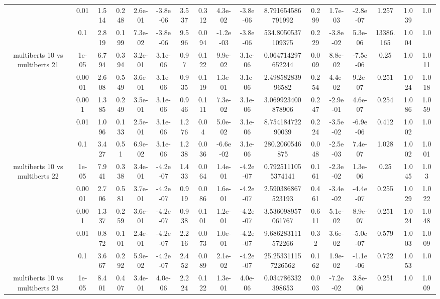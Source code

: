 \begin{tabular}{|c|c|c|c|c|c|c|c|c|c|c|c|c|c|c|c|c|}
 & 0.01 & 1.514 & 0.248 & 2.6e-01 & -3.8e-06 & 3.537 & 0.312 & 4.3e-02 & -3.8e-06 & 8.791654586791992 & 0.299 & 1.7e-03 & -2.8e-07 & 1.257 & 1.039 & 1.0 \\
 & 0.1 & 2.819 & 0.199 & 7.3e-02 & -3.8e-06 & 9.596 & 0.094 & -1.2e-03 & -3.8e-06 & 534.8050537109375 & 0.229 & -3.8e-02 & 5.3e-06 & 13386.165 & 1.004 & 1.0 \\
\hline
\multirow{5}{*}{multiberts 10 vs multiberts 21} & 1e-05 & 6.794 & 0.394 & 3.2e-01 & 3.1e-06 & 0.97 & 0.122 & 9.9e-02 & 3.1e-06 & 0.064714297652244 & 0.009 & 8.8e-02 & -7.5e-06 & 0.25 & 1.0 & 1.011 \\
 & 0.0001 & 2.608 & 0.549 & 3.6e-01 & 3.1e-06 & 0.935 & 0.119 & 1.3e-01 & 3.1e-06 & 2.49858283996582 & 0.254 & 4.4e-02 & 9.2e-07 & 0.251 & 1.024 & 1.018 \\
 & 0.001 & 1.385 & 0.249 & 3.5e-01 & 3.1e-06 & 0.946 & 0.111 & 7.3e-02 & 3.1e-06 & 3.069923400878906 & 0.247 & -2.9e-01 & 4.6e-07 & 0.254 & 1.086 & 1.059 \\
 & 0.01 & 1.096 & 0.133 & 2.5e-01 & 3.1e-06 & 1.276 & 0.04 & 5.0e-02 & 3.1e-06 & 8.75418472290039 & 0.224 & -3.5e-02 & -6.9e-06 & 0.412 & 1.002 & 1.0 \\
 & 0.1 & 3.427 & 0.51 & 6.9e-02 & 3.1e-06 & 1.238 & 0.036 & -6.6e-02 & 3.1e-06 & 280.2060546875 & 0.048 & -2.5e-03 & 7.4e-07 & 1.028 & 1.002 & 1.001 \\
\hline
\multirow{5}{*}{multiberts 10 vs multiberts 22} & 1e-05 & 7.941 & 0.338 & 3.4e-01 & -4.2e-07 & 1.433 & 0.064 & 1.4e-01 & -4.2e-07 & 0.7925111055374141 & 0.161 & -2.3e-02 & 1.3e-06 & 0.25 & 1.045 & 1.03 \\
 & 0.0001 & 2.706 & 0.581 & 3.7e-01 & -4.2e-07 & 0.919 & 0.086 & 1.6e-01 & -4.2e-07 & 2.590386867523193 & 0.461 & -3.4e-02 & -4.4e-07 & 0.255 & 1.029 & 1.022 \\
 & 0.001 & 1.337 & 0.259 & 3.6e-01 & -4.2e-07 & 0.938 & 0.101 & 1.2e-01 & -4.2e-07 & 3.536098957061767 & 0.611 & 5.1e-02 & 8.9e-07 & 0.251 & 1.024 & 1.048 \\
 & 0.01 & 0.872 & 0.101 & 2.4e-01 & -4.2e-07 & 2.216 & 0.073 & 1.0e-01 & -4.2e-07 & 9.686283111572266 & 0.32 & 3.6e-02 & -5.0e-07 & 0.579 & 1.003 & 1.009 \\
 & 0.1 & 3.667 & 0.292 & 5.9e-02 & -4.2e-07 & 2.452 & 0.089 & 2.1e-02 & -4.2e-07 & 25.253311157226562 & 0.162 & 1.9e-02 & -1.1e-06 & 0.722 & 1.053 & 1.0 \\
\hline
\multirow{5}{*}{multiberts 10 vs multiberts 23} & 1e-05 & 8.401 & 0.407 & 3.4e-01 & 4.0e-06 & 2.224 & 0.122 & 1.3e-01 & 4.0e-06 & 0.034786332398653 & 0.003 & -7.2e-02 & 3.8e-06 & 0.251 & 1.0 & 1.009 \\

\end{tabular}
